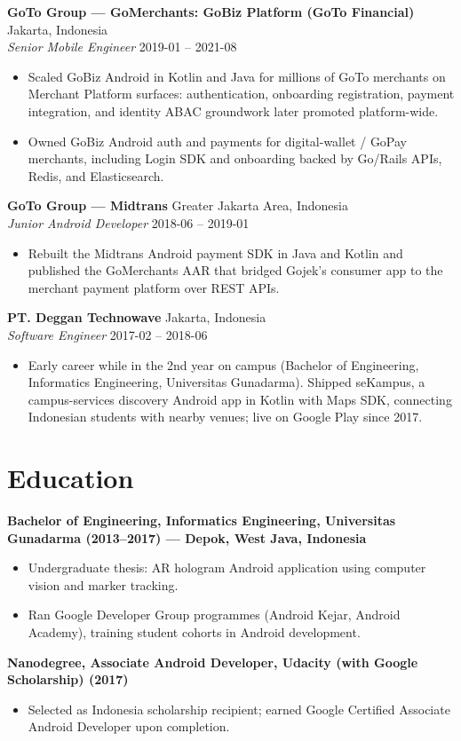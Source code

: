 \documentclass[11pt]{article}
\begin{document}
\textbf{GoTo Group — GoMerchants: GoBiz Platform (GoTo Financial)} \hfill Jakarta, Indonesia\\
\textit{Senior Mobile Engineer} \hfill 2019-01 -- 2021-08\\
\begin{itemize}
\item Scaled GoBiz Android in Kotlin and Java for millions of GoTo merchants on Merchant Platform surfaces: authentication, onboarding registration, payment integration, and identity ABAC groundwork later promoted platform-wide.
\item Owned GoBiz Android auth and payments for digital-wallet / GoPay merchants, including Login SDK and onboarding backed by Go/Rails APIs, Redis, and Elasticsearch.
\end{itemize}

\textbf{GoTo Group — Midtrans} \hfill Greater Jakarta Area, Indonesia\\
\textit{Junior Android Developer} \hfill 2018-06 -- 2019-01\\
\begin{itemize}
\item Rebuilt the Midtrans Android payment SDK in Java and Kotlin and published the GoMerchants AAR that bridged Gojek's consumer app to the merchant payment platform over REST APIs.
\end{itemize}

\textbf{PT. Deggan Technowave} \hfill Jakarta, Indonesia\\
\textit{Software Engineer} \hfill 2017-02 -- 2018-06\\
\begin{itemize}
\item Early career while in the 2nd year on campus (Bachelor of Engineering, Informatics Engineering, Universitas Gunadarma). Shipped seKampus, a campus-services discovery Android app in Kotlin with Maps SDK, connecting Indonesian students with nearby venues; live on Google Play since 2017.
\end{itemize}

\section*{Education}
\textbf{Bachelor of Engineering, Informatics Engineering, Universitas Gunadarma (2013–2017) — Depok, West Java, Indonesia}\\
\begin{itemize}
\item Undergraduate thesis: AR hologram Android application using computer vision and marker tracking.
\item Ran Google Developer Group programmes (Android Kejar, Android Academy), training student cohorts in Android development.
\end{itemize}
\textbf{Nanodegree, Associate Android Developer, Udacity (with Google Scholarship) (2017)}\\
\begin{itemize}
\item Selected as Indonesia scholarship recipient; earned Google Certified Associate Android Developer upon completion.
\end{itemize}
\end{document}
